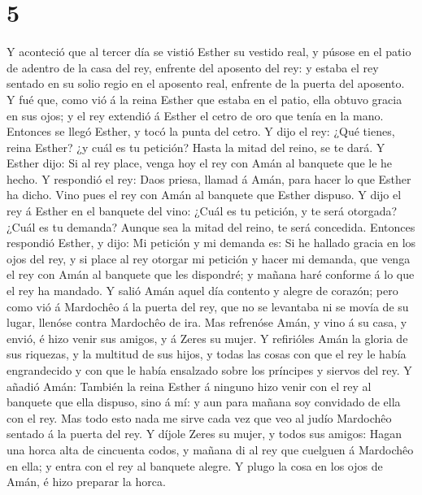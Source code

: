 \hypertarget{section-4}{%
\section{5}\label{section-4}}

 Y aconteció que al tercer día se vistió Esther su vestido
real, y púsose en el patio de adentro de la casa del rey, enfrente del
aposento del rey: y estaba el rey sentado en su solio regio en el
aposento real, enfrente de la puerta del aposento.  Y fué
que, como vió á la reina Esther que estaba en el patio, ella obtuvo
gracia en sus ojos; y el rey extendió á Esther el cetro de oro que tenía
en la mano. Entonces se llegó Esther, y tocó la punta del cetro.
 Y dijo el rey: ¿Qué tienes, reina Esther? ¿y cuál es tu
petición? Hasta la mitad del reino, se te dará.  Y Esther
dijo: Si al rey place, venga hoy el rey con Amán al banquete que le he
hecho.  Y respondió el rey: Daos priesa, llamad á Amán, para
hacer lo que Esther ha dicho. Vino pues el rey con Amán al banquete que
Esther dispuso.  Y dijo el rey á Esther en el banquete del
vino: ¿Cuál es tu petición, y te será otorgada? ¿Cuál es tu demanda?
Aunque sea la mitad del reino, te será concedida.  Entonces
respondió Esther, y dijo: Mi petición y mi demanda es:  Si
he hallado gracia en los ojos del rey, y si place al rey otorgar mi
petición y hacer mi demanda, que venga el rey con Amán al banquete que
les dispondré; y mañana haré conforme á lo que el rey ha mandado.
 Y salió Amán aquel día contento y alegre de corazón; pero
como vió á Mardochêo á la puerta del rey, que no se levantaba ni se
movía de su lugar, llenóse contra Mardochêo de ira.  Mas
refrenóse Amán, y vino á su casa, y envió, é hizo venir sus amigos, y á
Zeres su mujer.  Y refirióles Amán la gloria de sus
riquezas, y la multitud de sus hijos, y todas las cosas con que el rey
le había engrandecido y con que le había ensalzado sobre los príncipes y
siervos del rey.  Y añadió Amán: También la reina Esther á
ninguno hizo venir con el rey al banquete que ella dispuso, sino á mí: y
aun para mañana soy convidado de ella con el rey.  Mas todo
esto nada me sirve cada vez que veo al judío Mardochêo sentado á la
puerta del rey.  Y díjole Zeres su mujer, y todos sus
amigos: Hagan una horca alta de cincuenta codos, y mañana di al rey que
cuelguen á Mardochêo en ella; y entra con el rey al banquete alegre. Y
plugo la cosa en los ojos de Amán, é hizo preparar la horca.

